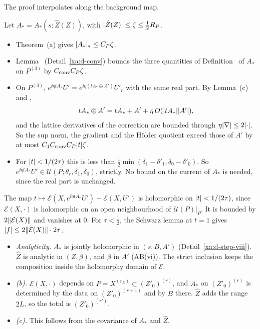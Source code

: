 \begin{detail}\label{xa:d-comp}
The proof interpolates along the background map.
\begin{step}
Let $A_*=A_*(s;\hat Z(Z))$, with $\lvert\hat Z(Z)\rvert\le\zeta\le\frac12R_P$.
\begin{itemize}
\item Theorem~(a) gives $\lvert A_*\rvert_*\le C_P\zeta$.
\item Lemma~ (Detail~\ref{xa:d-conv}) bounds the three quantities of Definition~ of $A_*$ on $P^{(3)}$ by $C_{\rm conv}C_P\zeta$.
\item On $P^{(3)}$, $e^{\ii\eta tA_*}U'=e^{\ii\eta(tA_*\oplus A')}U'_r$ with the same real part. By Lemma~(c) and ,
\[
tA_*\oplus A'=tA_*+A'+\eta\,O(\lvert tA_*\rvert\lvert A'\rvert),
\]
and the lattice derivatives of the correction are bounded through $\eta\lvert\nabla\rvert\le2\lvert\cdot\rvert$. So the sup norm, the gradient and the H\"older quotient exceed those of $A'$ by at most $C_1C_{\rm conv}C_P\lvert t\rvert\zeta$.
\item For $\lvert t\rvert<1/(2\tau)$ this is less than $\frac12\min(\delta_1-\delta'_1,\delta_0-\delta'_0)$. So $e^{\ii\eta tA_*}U'\in\mathcal U(P;\theta_r,\delta_1,\delta_0)$, strictly. No bound on the current of $A_*$ is needed, since the real part is unchanged.
\end{itemize}
The map $t\mapsto\mathcal E(X,e^{\ii\eta tA_*}U')-\mathcal E(X,U')$ is holomorphic on $\lvert t\rvert<1/(2\tau)$, since $\mathcal E(X,\cdot)$ is holomorphic on an open neighbourhood of $\mathcal U(P)|_P$. It is bounded by $2\lVert\mathcal E(X)\rVert$ and vanishes at $0$. For $\tau<\frac12$, the Schwarz lemma at $t=1$ gives $\lvert f\rvert\le2\lVert\mathcal E(X)\rVert\cdot2\tau$.
\end{step}

\begin{step}[(a): analyticity; (b), (c)]
\begin{itemize}
\item \emph{Analyticity.} $A_*$ is jointly holomorphic in $(s,B,A')$ (Detail~\ref{xa:d-step-viii}). $\hat Z$ is analytic in $(Z,\beta)$, and $\beta$ in $A'$ (AB(vi)). The strict inclusion keeps the composition inside the holomorphy domain of $\mathcal E$.
\item \emph{(b).} $\mathcal E(X,\cdot)$ depends on $P=X^{(r_E)}\subset(Z'_0)^{(r)}$, and $A_*$ on $(Z'_0)^{(r)}$ is determined by the data on $(Z'_0)^{(r+1)}$ and by $B$ there. $\hat Z$ adds the range $2L$, so the total is $(Z'_0)^{(r')}$.
\item \emph{(c).} This follows from the covariance of $A_*$ and $\hat Z$.
\end{itemize}
\end{step}


\end{detail}
